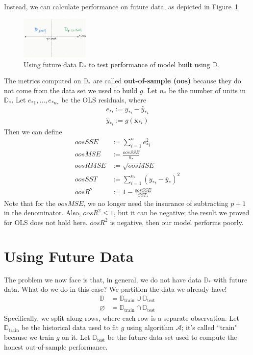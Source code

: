 \documentclass[12pt, a4paper]{article}
\theoremstyle{definition}
\begin{document}
	Instead, we can calculate performance on future data, as depicted in Figure~\ref{fig:future-data}
	\begin{figure}
		\centering
		\includegraphics[width=0.3\textwidth]{future-data}
		\caption{Using future data $\mathbb{D}_*$ to test performance of model
		built using $\mathbb{D}$.}
		\label{fig:future-data}
	\end{figure}
	The metrics computed on $\mathbb{D}_*$ are called \textbf{out-of-sample (oos)}
	because they do not come from the data set we used to build $g$.
	Let $n_*$ be the number of units in $\mathbb{D}_*$. Let $e_{*1},\ldots,e_{*n_*}$
	be the OLS residuals, where
	\begin{align*}
		e_{*i}:=y_{*i}-\hat{y}_{*i}\\
		\hat{y}_{*i} := g(\mathbf{x}_{*i})
	\end{align*}
	Then we can define
	\begin{align*}
		oosSSE &:= \sum_{i=1}^{n}e_{*i}^2\\
		oosMSE &:= \frac{oosSSE}{n_*}\\
		oosRMSE &:= \sqrt{oosMSE}\\
		oosSST &:= \sum_{i=1}^{n_*}(y_{*i}-\bar{y}_*)^2\\
		oosR^2 &:= 1 - \frac{oosSSE}{SST_*}
	\end{align*}
	Note that for the $oosMSE$, we no longer need the insurance 
	of subtracting $p+1$ in the denominator. Also, $oosR^2\leq 1$, but it can be
	negative; the result we proved for OLS does not hold here. $oosR^2$ is negative,
	then our model performs poorly.
	\section*{Using Future Data}
	The problem we now face is that, in general, we do not have data $\mathbb{D}_*$
	with future data. What do we do in this case? We partition the data we already have!
	\begin{align*}
		\mathbb{D} &= \mathbb{D}_{\text{train}} \cup \mathbb{D}_{\text{test}}\\
		\varnothing &= \mathbb{D}_{\text{train}} \cap \mathbb{D}_{\text{test}}
	\end{align*}
	Specifically, we split along rows, where each row is a separate observation.
	Let $\mathbb{D}_{\text{train}}$ be the historical data used to fit $g$
	using algorithm $\mathcal{A}$; it's called ``train" because we train $g$ on it.
	Let $\mathbb{D}_{\text{test}}$ be the future data set used to compute the
	honest out-of-sample performance.
	
\end{document}
